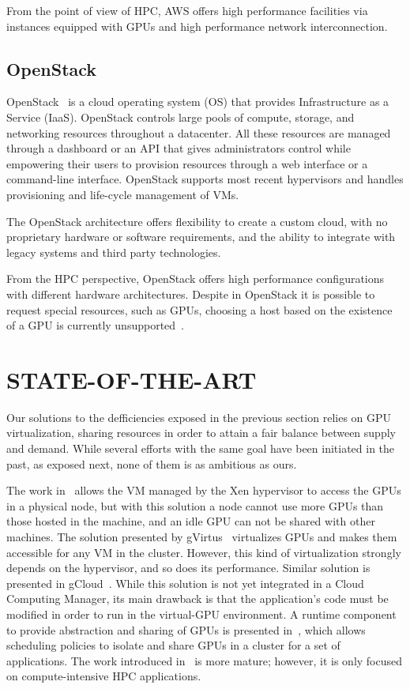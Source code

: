 \documentclass[a4paper,twoside]{article}
\begin{document}
From the point of view of HPC, AWS offers high performance facilities via 
instances equipped with GPUs and high performance network interconnection.

\subsection{OpenStack}
\label{sec:openstack}

OpenStack~\cite{OpenStack} is a cloud operating system (OS) that provides Infrastructure as a Service (IaaS). 
OpenStack controls large pools of compute, storage, and networking resources throughout a 
datacenter. All these resources are managed through a dashboard or an API that gives administrators 
control while empowering their users to provision resources through a web interface
or a command-line interface.  
OpenStack supports most recent hypervisors and handles provisioning 
and life-cycle management of VMs.
 
The OpenStack architecture offers flexibility to create a custom cloud, with no proprietary hardware
or software requirements, and the ability to integrate with legacy systems and third party technologies. 

From the HPC perspective, OpenStack offers high performance configurations with different hardware architectures. Despite in OpenStack it is possible to 
request special resources, such as GPUs, choosing a host based on the existence
of a GPU is currently unsupported~\cite{OpenStackGPU}. 

\section{\uppercase{State-of-the-Art}}
\label{sec:state}
Our solutions to the defficiencies exposed in the previous section relies on GPU virtualization, sharing resources in order
to attain a fair balance between supply and demand. 
While several efforts with the same goal have been initiated in the past, as exposed next, 
none of them is as ambitious as ours. 

The work in~\cite{younge2013enabling} allows the VM managed
by the Xen hypervisor to access the GPUs in a physical
node, but with this solution a node cannot 
use more GPUs than those hosted in the machine, and an idle GPU can not be shared with other machines. The solution presented 
by gVirtus~\cite{gvirtus} virtualizes GPUs and makes
them accessible for any VM in the cluster. However, this kind
of virtualization strongly depends on the hypervisor, and so
does its performance. Similar solution is presented in gCloud~\cite{diab2013dynamic}. 
While this solution is not yet integrated in a Cloud Computing Manager, its main
drawback is that the application's code must be modified
in order to run in the virtual-GPU environment. A runtime component to provide abstraction
and sharing of GPUs is presented in~\cite{becchi2012virtual}, which allows scheduling policies 
to isolate and share GPUs in a cluster for a set of applications. 
The work introduced in~\cite{jungpgpu} is more mature; however,
it is only focused on compute-intensive HPC applications. 
\end{document}
